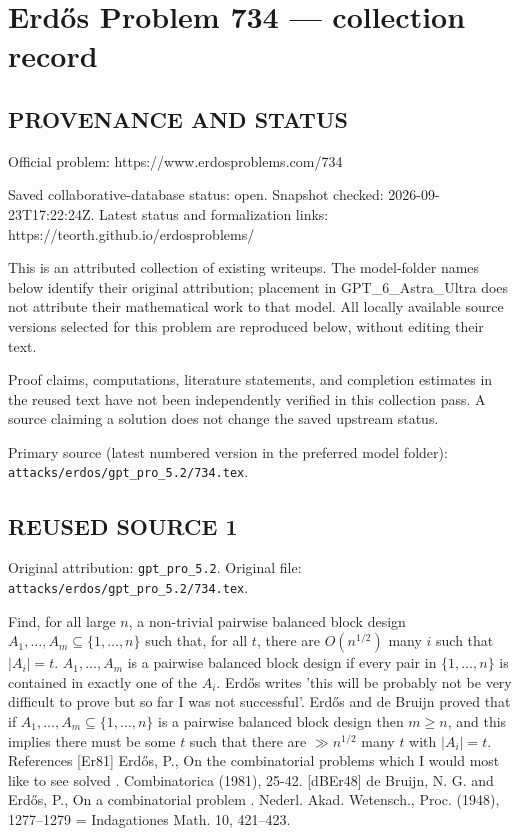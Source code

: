 \section*{Erd\H{o}s Problem 734 --- collection record}

\subsection*{PROVENANCE AND STATUS}
Official problem: https://www.erdosproblems.com/734

Saved collaborative-database status: open.
Snapshot checked: 2026-09-23T17:22:24Z.
Latest status and formalization links: https://teorth.github.io/erdosproblems/

This is an attributed collection of existing writeups. The model-folder names below identify their original attribution; placement in GPT\_6\_Astra\_Ultra does not attribute their mathematical work to that model. All locally available source versions selected for this problem are reproduced below, without editing their text.

Proof claims, computations, literature statements, and completion estimates in the reused text have not been independently verified in this collection pass. A source claiming a solution does not change the saved upstream status.

Primary source (latest numbered version in the preferred model folder): \texttt{attacks/erdos/gpt\_pro\_5.2/734.tex}.

\subsection*{REUSED SOURCE 1}
Original attribution: \texttt{gpt\_pro\_5.2}.
Original file: \texttt{attacks/erdos/gpt\_pro\_5.2/734.tex}.


Find, for all large $n$, a non-trivial pairwise balanced block design $A_1,\ldots,A_m\subseteq \{1,\ldots,n\}$ such that, for all $t$, there are $O(n^{1/2})$ many $i$ such that $\lvert A_i\rvert=t$. $A_1,\ldots,A_m$ is a pairwise balanced block design if every pair in $\{1,\ldots,n\}$ is contained in exactly one of the $A_i$. Erd\H{o}s \cite{Er81} writes 'this will be probably not be very difficult to prove but so far I was not successful'. Erd\H{o}s and de Bruijn \cite{dBEr48} proved that if $A_1,\ldots,A_m\subseteq \{1,\ldots,n\}$ is a pairwise balanced block design then $m\geq n$, and this implies there must be some $t$ such that there are $\gg n^{1/2}$ many $t$ with $\lvert A_i\rvert=t$. References [Er81] Erd\H{o}s, P., On the combinatorial problems which I would most like to see solved . Combinatorica (1981), 25-42. [dBEr48] de Bruijn, N. G. and Erd\H{o}s, P., On a combinatorial problem . Nederl. Akad. Wetensch., Proc. (1948), 1277--1279 = Indagationes Math. 10, 421--423.


